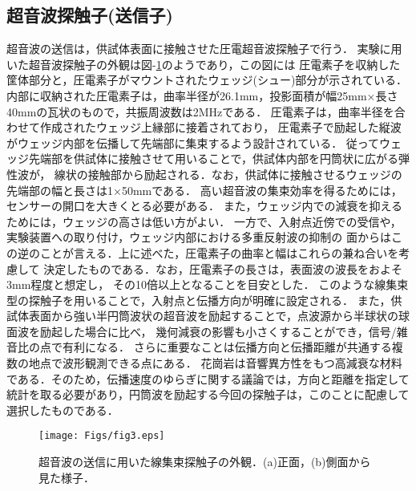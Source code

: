 \subsection{超音波探触子(送信子)}
超音波の送信は，供試体表面に接触させた圧電超音波探触子で行う．
実験に用いた超音波探触子の外観は図-\ref{fig:fig2}のようであり，この図には
圧電素子を収納した筐体部分と，圧電素子がマウントされたウェッジ(シュー)部分が示されている．
内部に収納された圧電素子は，曲率半径が26.1mm，投影面積が幅25mm×長さ40mmの瓦状のもので，共振周波数は2MHzである．
圧電素子は，曲率半径を合わせて作成されたウェッジ上縁部に接着されており，
圧電素子で励起した縦波がウェッジ内部を伝播して先端部に集束するよう設計されている．
従ってウェッジ先端部を供試体に接触させて用いることで，供試体内部を円筒状に広がる弾性波が，
線状の接触部から励起される．なお，供試体に接触させるウェッジの先端部の幅と長さは1×50mmである．
%
高い超音波の集束効率を得るためには，センサーの開口を大きくとる必要がある．
また，ウェッジ内での減衰を抑えるためには，ウェッジの高さは低い方がよい．
一方で、入射点近傍での受信や，実験装置への取り付け，ウェッジ内部における多重反射波の抑制の
面からはこの逆のことが言える．上に述べた，圧電素子の曲率と幅はこれらの兼ね合いを考慮して
決定したものである．なお，圧電素子の長さは，表面波の波長をおよそ3mm程度と想定し，
その10倍以上となることを目安とした．
%
このような線集束型の探触子を用いることで，入射点と伝播方向が明確に設定される．
また，供試体表面から強い半円筒波状の超音波を励起することで，点波源から半球状の球面波を励起した場合に比べ，
幾何減衰の影響も小さくすることができ，信号/雑音比の点で有利になる．
%
さらに重要なことは伝播方向と伝播距離が共通する複数の地点で波形観測できる点にある．
花崗岩は音響異方性をもつ高減衰な材料である．そのため，伝播速度のゆらぎに関する議論では，方向と距離を指定して統計を取る必要があり，円筒波を励起する今回の探触子は，このことに配慮して選択したものである．
\begin{figure}[h]
\begin{center}
\texttt{[image: Figs/fig3.eps]}
\caption{
	超音波の送信に用いた線集束探触子の外観．(a)正面，(b)側面から見た様子．
}
\label{fig:fig2}
\end{center}
	\vspace{-5mm}
\end{figure}
